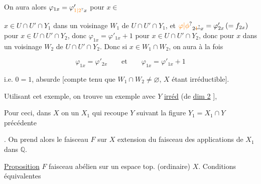  On aura alors $\varphi_{1x}=\varphi'_{\unsure{1|2}x}$  pour $x\in$

$x\in U\cap U'\cap Y_1$  dans un voisinage $W_1$ de $U\cap U'\cap Y_1$, et $\unsure{\varphi|\phi}_{2\deleted{\unsure{1}}x}=\varphi'_{2x}\,(=f_{2x})$  pour $x\in U\cap U'\cap Y_2$, donc $\varphi_{1x}=\varphi'_{1x}+1$ pour $x\in U\cap U'\cap Y_2$, donc pour $x$ dans un voisinage $W_2$ de $U\cap U'\cap Y_{2}$. Donc si $x\in W_1\cap W_2$, on aura  à la fois

\[
\varphi_{1x}=\varphi'_{2x}\qquad\text{et}\qquad\varphi_{1x}=\varphi'_{1x}+1
\]

i.e. $0=1$, absurde [compte tenu que $W_1\cap W_2\ne\varnothing$, $X$ étant irréductible].

Utilisant cet exemple, on trouve un exemple avec $Y$ \uline{irréd} (de \uline{dim 2} ],

Pour ceci, dans $X$ on  un $X_1$  qui recoupe $Y$ suivant la figure $Y_1=X_1\cap Y$ précédente



. On prend alors le faisceau $F$ sur $X$ extension  du faisceau des applications de $X_1$ dans $\mathbb{Q}$.

\uline{Proposition} $F$ faisceau abélien sur un espace top. (ordinaire) $X$. Conditions équivalentes

